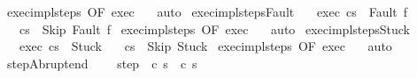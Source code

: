 \begin{isabellebody}
%
\isadelimproof
%
\endisadelimproof
%
\isatagproof
{}\isamarkupfalse%
\ exec{\isacharunderscore}impl{\isacharunderscore}steps\ {\isacharbrackleft}OF\ exec{\isacharbrackright}\ \ \isanewline
{}\isamarkupfalse%
\ auto%
\endisatagproof
{\isafoldproof}%
%
\isadelimproof
\isanewline
%
\endisadelimproof
\isanewline
{}\isamarkupfalse%
\ exec{\isacharunderscore}impl{\isacharunderscore}steps{\isacharunderscore}Fault{\isacharcolon}\isanewline
\ \ \ exec{\isacharcolon}\ {\isachardoublequoteopen}{\isasymGamma}{\isasymturnstile}{\isasymlangle}c{\isacharcomma}s{\isasymrangle}\ {\isasymRightarrow}\ Fault\ f{\isachardoublequoteclose}\isanewline
\ \ \ {\isachardoublequoteopen}{\isasymGamma}{\isasymturnstile}{\isacharparenleft}c{\isacharcomma}s{\isacharparenright}\ {\isasymrightarrow}\isactrlsup {\isacharasterisk}\ {\isacharparenleft}Skip{\isacharcomma}\ Fault\ f{\isacharparenright}{\isachardoublequoteclose}\isanewline
%
\isadelimproof
%
\endisadelimproof
%
\isatagproof
{}\isamarkupfalse%
\ exec{\isacharunderscore}impl{\isacharunderscore}steps\ {\isacharbrackleft}OF\ exec{\isacharbrackright}\ \ \isanewline
{}\isamarkupfalse%
\ auto%
\endisatagproof
{\isafoldproof}%
%
\isadelimproof
\isanewline
%
\endisadelimproof
\isanewline
{}\isamarkupfalse%
\ exec{\isacharunderscore}impl{\isacharunderscore}steps{\isacharunderscore}Stuck{\isacharcolon}\isanewline
\ \ \ exec{\isacharcolon}\ {\isachardoublequoteopen}{\isasymGamma}{\isasymturnstile}{\isasymlangle}c{\isacharcomma}s{\isasymrangle}\ {\isasymRightarrow}\ Stuck{\isachardoublequoteclose}\isanewline
\ \ \ {\isachardoublequoteopen}{\isasymGamma}{\isasymturnstile}{\isacharparenleft}c{\isacharcomma}s{\isacharparenright}\ {\isasymrightarrow}\isactrlsup {\isacharasterisk}\ {\isacharparenleft}Skip{\isacharcomma}\ Stuck{\isacharparenright}{\isachardoublequoteclose}\isanewline
%
\isadelimproof
%
\endisadelimproof
%
\isatagproof
{}\isamarkupfalse%
\ exec{\isacharunderscore}impl{\isacharunderscore}steps\ {\isacharbrackleft}OF\ exec{\isacharbrackright}\ \ \isanewline
{}\isamarkupfalse%
\ auto%
\endisatagproof
{\isafoldproof}%
%
\isadelimproof
\isanewline
%
\endisadelimproof
\isanewline
\isanewline
{}\isamarkupfalse%
\ step{\isacharunderscore}Abrupt{\isacharunderscore}end{\isacharcolon}\ \isanewline
\ \ \ step{\isacharcolon}\ {\isachardoublequoteopen}{\isasymGamma}{\isasymturnstile}\ {\isacharparenleft}c\ s{\isacharparenright}\ {\isasymrightarrow}\ {\isacharparenleft}c\ s{\isacharprime}{\isacharparenright}{\isachardoublequoteclose}\isanewline

\end{isabellebody}
